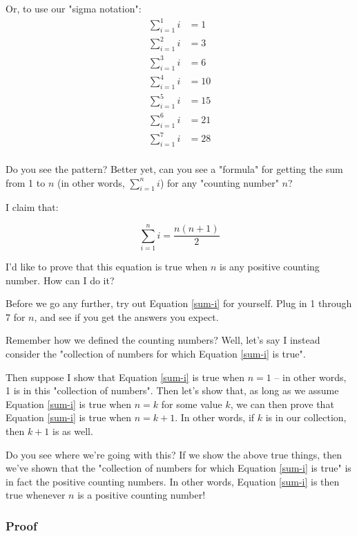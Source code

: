Or, to use our "sigma notation":
\begin{align*}
\sum_{i=1}^1 i &= 1 \\
\sum_{i=1}^2 i &= 3 \\
\sum_{i=1}^3 i &= 6 \\
\sum_{i=1}^4 i &= 10 \\
\sum_{i=1}^5 i &= 15 \\
\sum_{i=1}^6 i &= 21 \\
\sum_{i=1}^7 i &= 28 \\
\end{align*}

Do you see the pattern? Better yet, can you see a "formula" for getting the sum from 1 to $n$ (in other words, $\sum_{i=1}^n i$) for any "counting number" $n$?

\newpage

I claim that:

\begin{equation}
\label{sum-i}
\sum_{i=1}^n i = \frac{n(n+1)}{2}
\end{equation}

I'd like to prove that this equation is true when $n$ is any positive counting number. How can I do it? 

\begin{exercise}
Before we go any further, try out Equation \ref{sum-i} for yourself. Plug in 1 through 7 for $n$, and see if you get the answers you expect. 
\end{exercise}
\hfill

Remember how we defined the counting numbers? Well, let's say I instead consider the "collection of numbers for which Equation \ref{sum-i} is true". 

Then suppose I show that Equation \ref{sum-i} is true when $n = 1$ -- in other words, 1 is in this "collection of numbers". Then let's show that, as long as we assume Equation \ref{sum-i} is true when $n = k$ for some value $k$, we can then prove that Equation \ref{sum-i} is true when $n = k + 1$. In other words, if $k$ is in our collection, then $k+1$ is as well.

Do you see where we're going with this? If we show the above true things, then we've shown that the "collection of numbers for which Equation \ref{sum-i} is true" is in fact the positive counting numbers. In other words, Equation \ref{sum-i} is then true whenever $n$ is a positive counting number!

\subsubsection{Proof}

